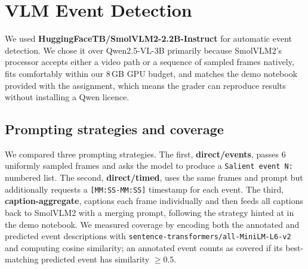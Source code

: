 \documentclass[sigconf, nonacm]{acmart}
\begin{document}
\section{VLM Event Detection}

We used \textbf{HuggingFaceTB/\allowbreak SmolVLM2-\allowbreak 2.2B-\allowbreak Instruct}
for automatic event detection. We chose it over Qwen2.5-VL-3B primarily
because SmolVLM2's processor accepts either a video path or a sequence of
sampled frames natively, fits comfortably within our 8\,GB GPU budget, and
matches the demo notebook provided with the assignment, which means the
grader can reproduce results without installing a Qwen licence.

\subsection*{Prompting strategies and coverage}

We compared three prompting strategies. The first, \textbf{direct/events},
passes 6 uniformly sampled frames and asks the model to produce a
\texttt{Salient event N:} numbered list. The second,
\textbf{direct/timed}, uses the same frames and prompt but additionally
requests a \texttt{[MM:SS-MM:SS]} timestamp for each event. The third,
\textbf{caption-aggregate}, captions each frame individually and then feeds
all captions back to SmolVLM2 with a merging prompt, following the strategy
hinted at in the demo notebook. We measured coverage by encoding both the annotated and predicted event
descriptions with \texttt{sentence-transformers/\allowbreak all-MiniLM-L6-v2}
and computing cosine similarity; an annotated event counts as covered if
its best-matching predicted event has similarity $\geq 0.5$.
\end{document}
